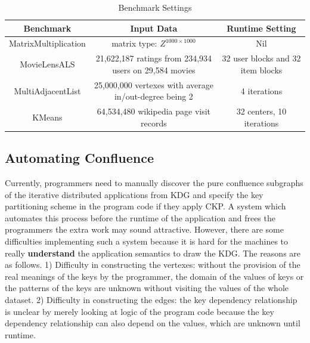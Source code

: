 \documentclass[10pt,journal,compsoc]{IEEEtran}
\begin{document}
\begin{table}[!t]
\renewcommand{\arraystretch}{1}
\caption{Benchmark Settings}
\label{table:benchmark}
\centering
\begin{tabularx}{0.85\textwidth}{ c || c | c }
\hline
\textbf{Benchmark} & \textbf{Input Data} & \textbf{Runtime Setting} \\
\hline
MatrixMultiplication & matrix type: $Z^{1000 \times 1000}$ & Nil\\
\hline
MovieLensALS & 21,622,187 ratings from 234,934 users on 29,584 movies &32 user blocks and 32 item blocks\\%
\hline
MultiAdjacentList & 25,000,000 vertexes with average in/out-degree being 2& 4 iterations \\%
\hline
KMeans & 64,534,480 wikipedia page visit records& 32 centers, 10 iterations \\
\hline
\end{tabularx}
\end{table}


\subsection{Automating Confluence}
Currently, programmers need to manually discover the pure confluence subgraphs of the iterative distributed applications from KDG and specify the key partitioning scheme in the program code if they apply CKP. 
A system which automates this process before the runtime of the application and frees the programmers the extra work may sound attractive. 
However, there are some difficulties implementing such a system because 
it is hard for the machines to really \textbf{understand} the application semantics to draw the KDG. 
The reasons are as follows. 
1) Difficulty in constructing the vertexes: 
without the provision of the real meanings of the keys by the programmer, 
the domain of the values of keys or the patterns of the keys are unknown without visiting the values of the whole dataset. 
2) Difficulty in constructing the edges: 
the key dependency relationship is unclear by merely looking at logic of the program code because the key dependency relationship can also depend on the values, which are unknown until runtime. 
\end{document}
